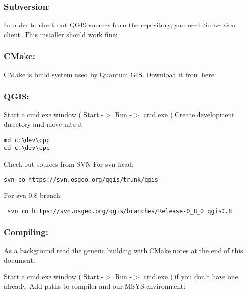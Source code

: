 \hypertarget{toc14}{}
\subsubsection{Subversion:}
In order to check out QGIS sources from the repository, you need Subversion
client. This installer should work fine:


\hypertarget{toc15}{}
\subsubsection{CMake:}
CMake is build system used by Quantum GIS. Download it from here:


\hypertarget{toc16}{}
\subsubsection{QGIS:}
Start a cmd.exe window ( Start -$>$ Run -$>$ cmd.exe ) Create development 
directory and move into it

\begin{verbatim}
md c:\dev\cpp 
cd c:\dev\cpp 
\end{verbatim}

Check out sources from SVN For svn head:

\begin{verbatim}
svn co https://svn.osgeo.org/qgis/trunk/qgis 
\end{verbatim}
For svn 0.8 branch

\begin{verbatim}
 svn co https://svn.osgeo.org/qgis/branches/Release-0_8_0 qgis0.8
\end{verbatim}

\hypertarget{toc17}{}
\subsubsection{Compiling:}
As a background read the generic building with CMake notes at the end of 
this document.

Start a cmd.exe window ( Start -$>$ Run -$>$ cmd.exe ) if you don't have one
already.  Add paths to compiler and our MSYS environment:

